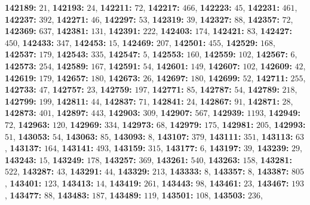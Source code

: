 \textsf{\bfseries 142189:} $21$, \textsf{\bfseries 142193:} $24$, \textsf{\bfseries 142211:} $72$, \textsf{\bfseries 142217:} $466$, \textsf{\bfseries 142223:} $45$, \textsf{\bfseries 142231:} $461$, \textsf{\bfseries 142237:} $392$, \textsf{\bfseries 142271:} $46$, \textsf{\bfseries 142297:} $53$, \textsf{\bfseries 142319:} $39$, \textsf{\bfseries 142327:} $88$, \textsf{\bfseries 142357:} $72$, \textsf{\bfseries 142369:} $637$, \textsf{\bfseries 142381:} $131$, \textsf{\bfseries 142391:} $222$, \textsf{\bfseries 142403:} $174$, \textsf{\bfseries 142421:} $83$, \textsf{\bfseries 142427:} $450$, \textsf{\bfseries 142433:} $347$, \textsf{\bfseries 142453:} $15$, \textsf{\bfseries 142469:} $207$, \textsf{\bfseries 142501:} $455$, \textsf{\bfseries 142529:} $168$, \textsf{\bfseries 142537:} $179$, \textsf{\bfseries 142543:} $335$, \textsf{\bfseries 142547:} $5$, \textsf{\bfseries 142553:} $160$, \textsf{\bfseries 142559:} $102$, \textsf{\bfseries 142567:} $6$, \textsf{\bfseries 142573:} $254$, \textsf{\bfseries 142589:} $167$, \textsf{\bfseries 142591:} $54$, \textsf{\bfseries 142601:} $149$, \textsf{\bfseries 142607:} $102$, \textsf{\bfseries 142609:} $42$, \textsf{\bfseries 142619:} $179$, \textsf{\bfseries 142657:} $180$, \textsf{\bfseries 142673:} $26$, \textsf{\bfseries 142697:} $180$, \textsf{\bfseries 142699:} $52$, \textsf{\bfseries 142711:} $255$, \textsf{\bfseries 142733:} $47$, \textsf{\bfseries 142757:} $23$, \textsf{\bfseries 142759:} $197$, \textsf{\bfseries 142771:} $85$, \textsf{\bfseries 142787:} $54$, \textsf{\bfseries 142789:} $218$, \textsf{\bfseries 142799:} $199$, \textsf{\bfseries 142811:} $44$, \textsf{\bfseries 142837:} $71$, \textsf{\bfseries 142841:} $24$, \textsf{\bfseries 142867:} $91$, \textsf{\bfseries 142871:} $28$, \textsf{\bfseries 142873:} $401$, \textsf{\bfseries 142897:} $443$, \textsf{\bfseries 142903:} $309$, \textsf{\bfseries 142907:} $567$, \textsf{\bfseries 142939:} $1193$, \textsf{\bfseries 142949:} $72$, \textsf{\bfseries 142963:} $120$, \textsf{\bfseries 142969:} $334$, \textsf{\bfseries 142973:} $68$, \textsf{\bfseries 142979:} $175$, \textsf{\bfseries 142981:} $205$, \textsf{\bfseries 142993:} $51$, \textsf{\bfseries 143053:} $54$, \textsf{\bfseries 143063:} $85$, \textsf{\bfseries 143093:} $8$, \textsf{\bfseries 143107:} $379$, \textsf{\bfseries 143111:} $351$, \textsf{\bfseries 143113:} $63$, \textsf{\bfseries 143137:} $164$, \textsf{\bfseries 143141:} $493$, \textsf{\bfseries 143159:} $315$, \textsf{\bfseries 143177:} $6$, \textsf{\bfseries 143197:} $39$, \textsf{\bfseries 143239:} $29$, \textsf{\bfseries 143243:} $15$, \textsf{\bfseries 143249:} $178$, \textsf{\bfseries 143257:} $369$, \textsf{\bfseries 143261:} $540$, \textsf{\bfseries 143263:} $158$, \textsf{\bfseries 143281:} $522$, \textsf{\bfseries 143287:} $43$, \textsf{\bfseries 143291:} $44$, \textsf{\bfseries 143329:} $213$, \textsf{\bfseries 143333:} $8$, \textsf{\bfseries 143357:} $8$, \textsf{\bfseries 143387:} $805$, \textsf{\bfseries 143401:} $123$, \textsf{\bfseries 143413:} $14$, \textsf{\bfseries 143419:} $261$, \textsf{\bfseries 143443:} $98$, \textsf{\bfseries 143461:} $23$, \textsf{\bfseries 143467:} $193$, \textsf{\bfseries 143477:} $88$, \textsf{\bfseries 143483:} $187$, \textsf{\bfseries 143489:} $119$, \textsf{\bfseries 143501:} $108$, \textsf{\bfseries 143503:} $236$, 
